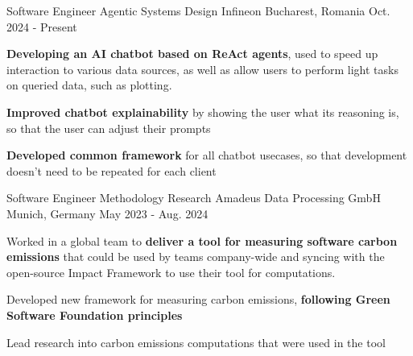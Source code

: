

\begin{cventries}

  \cventry
    {Software Engineer \quad\textbar\quad Agentic Systems Design} %
    {Infineon} %
    {Bucharest, Romania} %
    {Oct. 2024 - Present} %
    {
      \begin{cvitems} %
        \item {\textbf{Developing an AI chatbot based on ReAct agents}, used to speed up interaction to various data sources, as well as allow users to perform light tasks on queried data, such as plotting.}
        \item {\textbf{Improved chatbot explainability} by showing the user what its reasoning is, so that the user can adjust their prompts}
        \item {\textbf{Developed common framework} for all chatbot usecases, so that development doesn’t need to be repeated for each client}
      \end{cvitems}
    }

  \cventry
    {Software Engineer \quad\textbar\quad Methodology Research} %
    {Amadeus Data Processing GmbH} %
    {Munich, Germany} %
    {May 2023 - Aug. 2024} %
    {
      \begin{cvitems} %
        \item {Worked in a global team to \textbf{deliver a tool for measuring software carbon emissions} that could be used by teams company-wide and syncing with the open-source Impact Framework to use their tool for computations.}
        \item {Developed new framework for measuring carbon emissions, \textbf{following Green Software Foundation principles}}
        \item {Lead research into carbon emissions computations that were used in the tool}
      \end{cvitems}
    }


\end{cventries}
